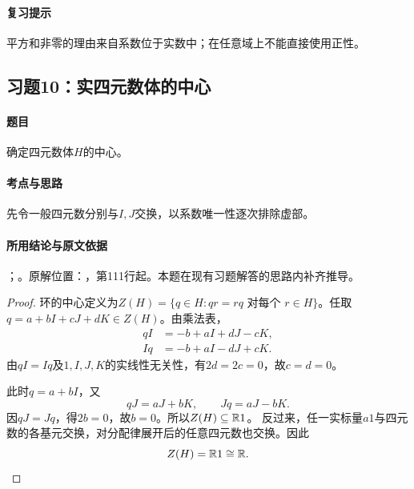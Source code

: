 \paragraph{复习提示}

平方和非零的理由来自系数位于实数中；在任意域上不能直接使用正性。



\subsection{习题10：实四元数体的中心}

\label{ex:3:10}

\paragraph{题目}

确定四元数体$H$的中心。

\paragraph{考点与思路}

先令一般四元数分别与$I,J$交换，以系数唯一性逐次排除虚部。

\paragraph{所用结论与原文依据}

；。原解位置：，第111行起。本题在现有习题解答的思路内补齐推导。


\begin{proof}

环的中心定义为$Z(H)=\{q\in H:qr=rq\text{ 对每个 }r\in H\}$。任取$q=a+bI+cJ+dK\in Z(H)$。由乘法表，
\begin{align*}
qI&=-b+aI+dJ-cK,\\
Iq&=-b+aI-dJ+cK.
\end{align*}
由$qI=Iq$及$1,I,J,K$的实线性无关性，有$2d=2c=0$，故$c=d=0$。

此时$q=a+bI$，又
\[
qJ=aJ+bK,\qquad Jq=aJ-bK.
\]
因$qJ=Jq$，得$2b=0$，故$b=0$。所以$Z(H)\subseteq\mathbb R1$。
反过来，任一实标量$a1$与四元数的各基元交换，对分配律展开后的任意四元数也交换。因此
\[
Z(H)=\mathbb R1\cong\mathbb R.
\]

\end{proof}

